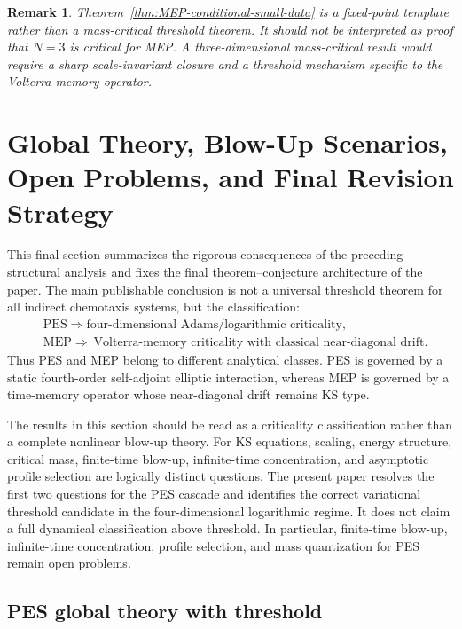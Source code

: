 \documentclass[pdflatex,sn-mathphys-num]{sn-jnl}%
\theoremstyle{thmstyleone}
\theoremstyle{thmstyletwo}
\newtheorem{remark}{Remark}
\theoremstyle{thmstylethree}
\begin{document}
\begin{remark}
Theorem~\ref{thm:MEP-conditional-small-data} is a fixed-point template rather
than a mass-critical threshold theorem.  It should not be interpreted as proof
that \(N=3\) is critical for MEP.  A three-dimensional mass-critical result
would require a sharp scale-invariant closure and a threshold mechanism
specific to the Volterra memory operator.
\end{remark}

\section{Global Theory, Blow-Up Scenarios, Open Problems, and Final Revision Strategy}
\label{sec:global-open-final}

This final section summarizes the rigorous consequences of the preceding structural analysis and fixes the final theorem--conjecture architecture of the paper.  The main publishable conclusion is not a universal threshold theorem for all indirect chemotaxis systems, but the classification:
\begin{equation*}
\begin{aligned}
&\mathrm{PES}\Rightarrow\text{four-dimensional Adams/logarithmic criticality},\\[2pt]
&\mathrm{MEP}\Rightarrow\ \text{Volterra-memory criticality with classical near-diagonal drift}.
\end{aligned}
\end{equation*}
Thus PES and MEP belong to different analytical classes.  PES is governed by a static fourth-order self-adjoint elliptic interaction, whereas MEP is governed by a time-memory operator whose near-diagonal drift remains KS type.

The results in this section should be read as a criticality classification rather than a
complete nonlinear blow-up theory.  For KS equations, scaling,
energy structure, critical mass, finite-time blow-up, infinite-time
concentration, and asymptotic profile selection are logically distinct
questions.  The present paper resolves the first two questions for the PES
cascade and identifies the correct variational threshold candidate in the
four-dimensional logarithmic regime.  It does not claim a full dynamical
classification above threshold.  In particular, finite-time blow-up,
infinite-time concentration, profile selection, and mass quantization for PES
remain open problems.

\subsection{PES global theory with threshold}
\end{document}
